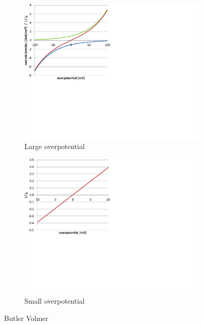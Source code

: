 \documentclass[11pt,a4paper,english,twoside]{scrreprt}
\begin{document}
\begin{figure}
  \centering
  \begin{subfigure}{.5\textwidth}
    \centering
    \includegraphics*[width=.95\linewidth, angle=0]{FCF_Chart_ButlerVolmer1.pdf}
    \caption{Large overpotential}
    \label{fig:ButlerVolmer1}
  \end{subfigure}%
  \begin{subfigure}{.5\textwidth}
    \centering
    \includegraphics*[width=.95\linewidth, angle=0]{FCF_Chart_ButlerVolmer2.pdf}
    \caption{Small overpotential}
    \label{fig:ButlerVolmer2}
  \end{subfigure}
  \caption[Butler Volmer]{Butler Volmer}
\end{figure}
 
\end{document}
